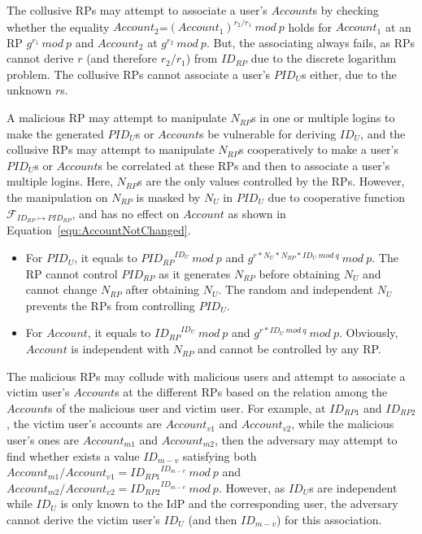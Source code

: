 The collusive RPs may attempt to associate  a user's $Account$s by checking whether the equality $Account_2$=$(Account_1)^{r_2/r_1}\ mod\ p$ holds for $Account_1$ at an RP $g^{r_1}\ mod\ p$ and $Account_2$ at $g^{r_2}\ mod\ p$.
But, the associating always fails, as RPs cannot derive $r$ (and therefore ${r_2/r_1}$) from $ID_{RP}$ due to the discrete logarithm problem.
The collusive RPs cannot associate a user's  $PID_U$s either, due to the unknown $r$s.


A malicious RP may attempt to manipulate $N_{RP}$s in one or multiple logins to make the generated $PID_U$s or $Account$s be vulnerable for deriving $ID_U$, 
 and the collusive RPs may attempt to manipulate $N_{RP}$s cooperatively to make a user's $PID_U$s or $Account$s be correlated at these RPs and then to associate a user's multiple logins.
Here, $N_{RP}$s are the only values controlled by the RPs.
However, the manipulation on $N_{RP}$ is masked by $N_U$ in $PID_U$ due to cooperative function $\mathcal{F}_{ID_{RP} \mapsto PID_{RP}}$,
 and has no effect on $Account$ as shown in Equation~\ref{equ:AccountNotChanged}.
\begin{itemize}
  \item For $PID_U$, it equals to ${PID_{RP}}^{ID_U}\ mod\ p$ and $g^{r*N_U*N_{RP}*ID_U\ mod\ q}\ mod\ p$. The RP cannot control $PID_{RP}$ as it generates $N_{RP}$ before obtaining $N_U$ and cannot change $N_{RP}$ after obtaining $N_U$. The random and independent $N_U$ prevents the RPs from controlling $PID_U$.      
  \item For $Account$, it equals to ${ID_{RP}}^{ID_U}\ mod\ p$ and $g^{r*ID_U\ mod\ q}\ mod\ p$. Obviously, $Account$ is independent with $N_{RP}$ and cannot be controlled by any RP.
\end{itemize}

The malicious RPs may collude with  malicious users and attempt to associate a victim user's $Account$s  at the different RPs based on the relation among the $Account$s of the malicious user and victim user.
For example, at $ID_{RP1}$ and $ID_{RP2}$, the victim user's accounts are $Account_{v1}$ and $Account_{v2}$, while the malicious user's ones are $Account_{m1}$ and $Account_{m2}$, then the adversary may attempt to find whether exists a value $ID_{m-v}$ satisfying both $Account_{m1}/Account_{v1}={ID_{RP1}}^{ID_{m-v}}\ mod\ p$ and $Account_{m2}/Account_{v2}={ID_{RP2}}^{ID_{m-v}}\ mod\ p$.
However, as $ID_U$s are independent while $ID_U$ is only known to the IdP and the corresponding user,
the adversary cannot derive the victim user's $ID_U$ (and then $ID_{m-v}$) for this association.

